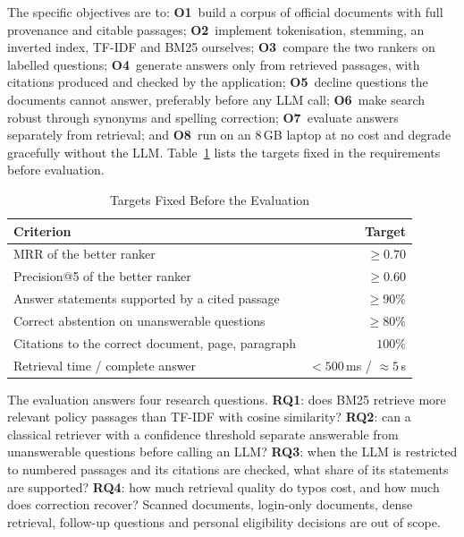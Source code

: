 \documentclass[conference]{IEEEtran}
\begin{document}
The specific objectives are to: \textbf{O1}~build a corpus of official documents with full provenance and citable passages; \textbf{O2}~implement tokenisation, stemming, an inverted index, TF-IDF and BM25 ourselves; \textbf{O3}~compare the two rankers on labelled questions; \textbf{O4}~generate answers only from retrieved passages, with citations produced and checked by the application; \textbf{O5}~decline questions the documents cannot answer, preferably before any LLM call; \textbf{O6}~make search robust through synonyms and spelling correction; \textbf{O7}~evaluate answers separately from retrieval; and \textbf{O8}~run on an 8\,GB laptop at no cost and degrade gracefully without the LLM. Table~\ref{tab:targets} lists the targets fixed in the requirements before evaluation.

\begin{table}[t]
\caption{Targets Fixed Before the Evaluation}
\label{tab:targets}
\centering
\footnotesize
\begin{tabular}{@{}lr@{}}
\toprule
\textbf{Criterion} & \textbf{Target} \\
\midrule
MRR of the better ranker & $\geq 0.70$ \\
Precision@5 of the better ranker & $\geq 0.60$ \\
Answer statements supported by a cited passage & $\geq 90\%$ \\
Correct abstention on unanswerable questions & $\geq 80\%$ \\
Citations to the correct document, page, paragraph & $100\%$ \\
Retrieval time / complete answer & $<500$\,ms / $\approx 5$\,s \\
\bottomrule
\end{tabular}
\end{table}

The evaluation answers four research questions. \textbf{RQ1}: does BM25 retrieve more relevant policy passages than TF-IDF with cosine similarity? \textbf{RQ2}: can a classical retriever with a confidence threshold separate answerable from unanswerable questions before calling an LLM? \textbf{RQ3}: when the LLM is restricted to numbered passages and its citations are checked, what share of its statements are supported? \textbf{RQ4}: how much retrieval quality do typos cost, and how much does correction recover? Scanned documents, login-only documents, dense retrieval, follow-up questions and personal eligibility decisions are out of scope.

\end{document}
